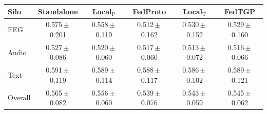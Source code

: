 \begin{tabular}{lccccc}
\toprule
\textbf{Silo} & \textbf{Standalone} & \textbf{Local$_{\mathrm{P}}$} & \textbf{FedProto} & \textbf{Local$_{\mathrm{T}}$} & \textbf{FedTGP} \\
\midrule
EEG & 0.575\,$\pm$\,0.201 & 0.558\,$\pm$\,0.119 & 0.512\,$\pm$\,0.162 & 0.530\,$\pm$\,0.152 & 0.529\,$\pm$\,0.160 \\
Audio & 0.527\,$\pm$\,0.086 & 0.520\,$\pm$\,0.060 & 0.517\,$\pm$\,0.060 & 0.513\,$\pm$\,0.072 & 0.516\,$\pm$\,0.066 \\
Text & 0.591\,$\pm$\,0.119 & 0.589\,$\pm$\,0.114 & 0.588\,$\pm$\,0.117 & 0.586\,$\pm$\,0.102 & 0.589\,$\pm$\,0.121 \\
\midrule
Overall & 0.565\,$\pm$\,0.082 & 0.556\,$\pm$\,0.060 & 0.539\,$\pm$\,0.076 & 0.543\,$\pm$\,0.059 & 0.545\,$\pm$\,0.062 \\
\bottomrule
\end{tabular}